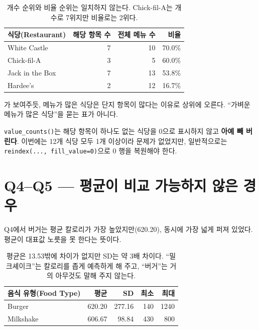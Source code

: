 \begin{table}[htbp]
\centering
\begin{tabular}{lrrr}
\toprule
식당(Restaurant) & 해당 항목 수 & 전체 메뉴 수 & 비율 \\
\midrule
White Castle    & 7 & 10 & 70.0\% \\
Chick-fil-A     & 3 & 5  & 60.0\% \\
Jack in the Box & 7 & 13 & 53.8\% \\
Hardee's        & 2 & 12 & 16.7\% \\
\bottomrule
\end{tabular}
\caption{개수 순위와 비율 순위는 일치하지 않는다. Chick-fil-A는 개수로 7위지만 비율로는
2위다.}
\label{tab:hw1-count-vs-rate}
\end{table}

가 보여주듯, 메뉴가 많은 식당은 단지 항목이 많다는 이유로
상위에 오른다. ``가벼운 메뉴가 많은 식당''을 묻는 표가 아니다.

\begin{pitfall}
\texttt{value\_counts()}는 해당 항목이 하나도 없는 식당을 0으로 표시하지 않고 \textbf{아예
빼 버린다}. 이번에는 12개 식당 모두 1개 이상이라 문제가 없었지만, 일반적으로는
\texttt{reindex(..., fill\_value=0)}으로 0 행을 복원해야 한다.
\end{pitfall}

\section{Q4--Q5 --- 평균이 비교 가능하지 않은 경우}
\label{sec:hw1-q45}

Q4에서 버거는 평균 칼로리가 가장 높았지만(620.20), 동시에 가장 넓게 퍼져 있었다.
평균이 대표값 노릇을 못 한다는 뜻이다.

\begin{table}[htbp]
\centering
\begin{tabular}{lrrrr}
\toprule
음식 유형(Food Type) & 평균 & SD & 최소 & 최대 \\
\midrule
Burger    & 620.20 & 277.16 & 140 & 1240 \\
Milkshake & 606.67 & 98.84  & 430 & 800  \\
\bottomrule
\end{tabular}
\caption{평균은 13.53밖에 차이가 없지만 SD는 약 3배 차이다. ``밀크셰이크''는 칼로리를
좁게 예측하게 해 주고, ``버거''는 거의 아무것도 말해 주지 않는다.}
\label{tab:hw1-burger-vs-shake}
\end{table}

